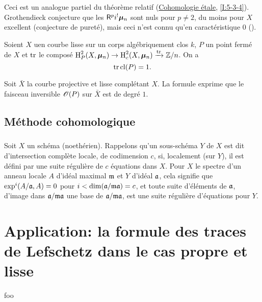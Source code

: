Ceci est un analogue partiel du th\'eor\`eme relatif 
(\hyperref[I]{Cohomologie \'etale}, \ref{I:5-3-4}). Grothendieck conjecture 
que les $\mathsf{R}^p i^! {\bm\mu}_n$ sont nuls pour $p\ne 2$, du moins pour $X$ excellent 
(conjecture de puret\'e), mais ceci n'est connu qu'en caract\'eristique $0$ 
(\cite[XIX]{sga4}). 




\begin{theorem}\label{IV:2-1-5}
Soient $X$ uen courbe lisse sur un corps alg\'ebriquement clos $k$, $P$ un 
point ferm\'e de $X$ et $\operatorname{tr}$ le compos\'e $\operatorname{H}_P^2(X,{\bm\mu}_n) \to \operatorname{H}_c^2(X,{\bm\mu}_n) \xrightarrow{\operatorname{tr}} \mathbb{Z}/n$. On a 
\[
  \operatorname{tr} \operatorname{cl}(P) = 1 \text{.}
\]
\end{theorem}

Soit $\bar X$ la courbe projective et lisse compl\'etant $X$. La formule 
exprime que le faisceau inversible $\mathscr{O}(P)$ sur $\bar X$ est de degr\'e $1$. 










\subsection{M\'ethode cohomologique}\label{IV:2-2}





\subsubsection{}\label{IV:2-2-1}

Soit $X$ un sch\'ema (noeth\'erien). Rappelons qu'un sous-sch\'ema $Y$ de $X$ 
est dit d'intersection compl\`ete locale, de codimension $c$, si, localement 
(sur $Y$), il est d\'efini par une suite r\'eguli\`ere de $c$ \'equations dans 
$X$. Pour $X$ le spectre d'un anneau locale $A$ d'id\'eal maximal $\mathfrak{m}$ et 
$Y$ d'id\'eal $\mathfrak{a}$, cela signifie que $\exp^i(A/\mathfrak{a},A) = 0$ pour 
$i<\dim(\mathfrak{a}/\mathfrak{m}\mathfrak{a})=c$, et toute suite d'\'el\'ements de $\mathfrak{a}$, d'image dans 
$\mathfrak{a}/\mathfrak{m}\mathfrak{a}$ une base de $\mathfrak{a}/\mathfrak{m}\mathfrak{a}$, est une suite r\'eguli\`ere 
d'\'equations pour $Y$. 










\section{Application: la formule des traces de Lefschetz dans le cas propre et lisse}\label{IV:3}

\begin{corollary_}\label{IV:3-7}
foo
\end{corollary_}
